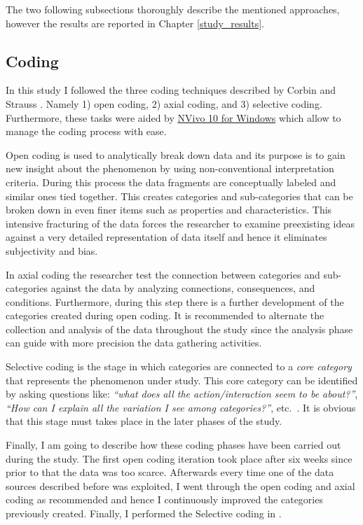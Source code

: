 The two following subsections thoroughly describe the mentioned approaches, however the results are reported in Chapter \ref{study_results}.

\subsection{Coding}
In this study I followed the three coding techniques described by Corbin and Strauss \cite{coding_guidelines}. Namely 1) open coding, 2) axial coding, and 3) selective coding. Furthermore, these tasks were aided by \href{http://www.qsrinternational.com/products_nvivo.aspx}{NVivo 10 for Windows} which allow to manage the coding process with ease.

Open coding is used to analytically break down data and its purpose is to gain new insight about the phenomenon by using non-conventional interpretation criteria. During this process the data fragments are conceptually labeled and similar ones tied together. This creates categories and sub-categories that can be broken down in even finer items such as properties and characteristics. This intensive fracturing of the data forces the researcher to examine preexisting ideas against a very detailed representation of data itself and hence it eliminates subjectivity and bias.

In axial coding the researcher test the connection between categories and sub-categories against the data by analyzing connections, consequences, and conditions. Furthermore, during this step there is a further development of the categories created during open coding. It is recommended to alternate the collection and analysis of the data throughout the study since the analysis phase can guide with more precision the data gathering activities.

Selective coding is the stage in which categories are connected to a \textit{core category} that represents the phenomenon under study. This core category can be identified by asking questions like: \textit{``what does all the action/interaction seem to be about?''}, \textit{``How can I explain all the variation I see among categories?''}, etc.\ \cite{coding_guidelines}. It is obvious that this stage must takes place in the later phases of the study.

Finally, I am going to describe how these coding phases have been carried out during the study. The first open coding iteration took place after six weeks since prior to that the data was too scarce. Afterwards every time one of the data sources described before was exploited, I went through the open coding and axial coding as recommended and hence  I continuously improved the categories previously created. Finally, I performed the Selective coding in .


